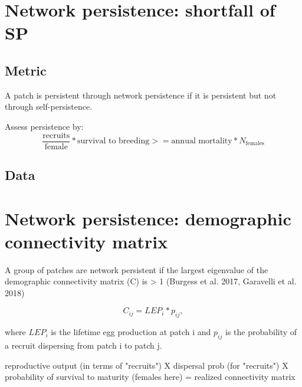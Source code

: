 \documentclass[12pt, oneside]{article}   	%
\begin{document}
\section*{Network persistence: shortfall of SP}
\subsection*{Metric}
A patch is persistent through network persistence if it is persistent but not through self-persistence.

Assess persistence by:
\begin{equation}
\frac{\text{recruits}}{\text{female}}*\text{survival to breeding} >= \text{annual mortality}*N_{\text{females}}
\end{equation}

\subsection*{Data}

\section*{Network persistence: demographic connectivity matrix}
A group of patches are network persistent if the largest eigenvalue of the demographic connectivity matrix (C) is > 1 (Burgess et al. 2017, Garavelli et al. 2018)

\begin{equation}
C_{ij} = LEP_i * p_{ij},
\end{equation}

where $LEP_i$ is the lifetime egg production at patch i and $p_{ij}$ is the probability of a recruit dispersing from patch i to patch j.

reproductive output (in terms of "recruits") X dispersal prob (for "recruits") X probability of survival to maturity (females here) = realized connectivity matrix






\end{document}
